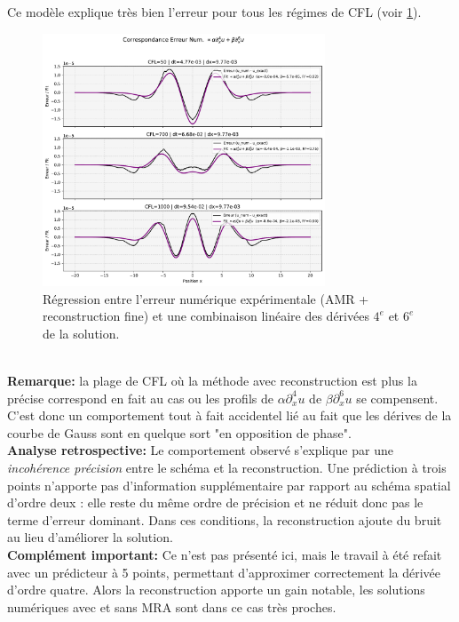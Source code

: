 Ce modèle explique très bien l'erreur pour tous les régimes de CFL (voir \ref{fig:derivees_vs_err}).
\begin{figure}[h!]
    \centering
    \includegraphics[width=0.75\textwidth]{media/4_travail/3/derivees_spatiales_VS_err_num.pdf}
    \caption{Régression entre l'erreur numérique expérimentale (AMR + reconstruction fine) et une combinaison linéaire des dérivées $4^e$ et $6^e$ de la solution.}
    \label{fig:derivees_vs_err}
\end{figure}\\
\textbf{Remarque:} la plage de CFL où la méthode avec reconstruction est plus la précise correspond en fait au cas ou les profils de $ \alpha \partial_x^4 u$
de $\beta \partial_x^6 u$ se compensent. C'est donc un comportement tout à fait accidentel lié au fait que les dérives de la courbe de Gauss sont en quelque sort "en opposition de phase".\\
\textbf{Analyse retrospective:} Le comportement observé s'explique par une \emph{incohérence précision} entre le schéma et la reconstruction.
Une prédiction à trois points n'apporte pas d'information supplémentaire par rapport au schéma spatial d'ordre deux :
elle reste du même ordre de précision et ne réduit donc pas le terme d'erreur dominant.
Dans ces conditions, la reconstruction ajoute du bruit au lieu d'améliorer la solution.\\
\textbf{Complément important:} Ce n'est pas présenté ici, mais le travail à été refait avec un prédicteur à 5 points, permettant d'approximer correctement la dérivée d'ordre quatre.
Alors la reconstruction apporte un gain notable, les solutions numériques avec et sans MRA sont dans ce cas très proches.
